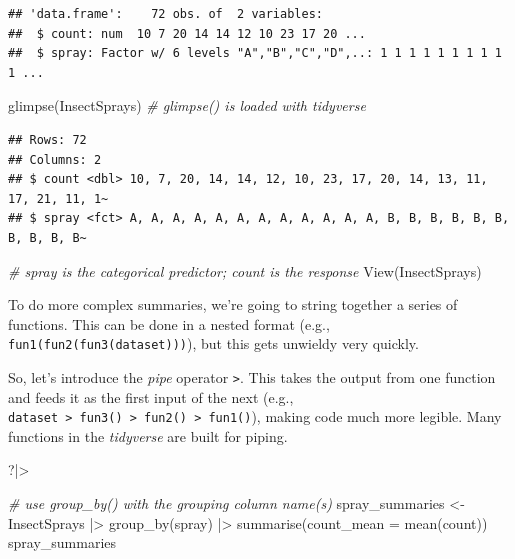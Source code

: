 \documentclass[
  11pt,
  a4paper,
]{book}
\newenvironment{Shaded}{\begin{snugshade}}{\end{snugshade}}
\newcommand{\AttributeTok}[1]{\textcolor[rgb]{0.77,0.63,0.00}{#1}}
\newcommand{\CommentTok}[1]{\textcolor[rgb]{0.56,0.35,0.01}{\textit{#1}}}
\newcommand{\FunctionTok}[1]{\textcolor[rgb]{0.00,0.00,0.00}{#1}}
\newcommand{\NormalTok}[1]{#1}
\newcommand{\OtherTok}[1]{\textcolor[rgb]{0.56,0.35,0.01}{#1}}
\newcommand{\SpecialCharTok}[1]{\textcolor[rgb]{0.00,0.00,0.00}{#1}}
\newcommand{\StringTok}[1]{\textcolor[rgb]{0.31,0.60,0.02}{#1}}
\begin{document}
\begin{verbatim}
## 'data.frame':    72 obs. of  2 variables:
##  $ count: num  10 7 20 14 14 12 10 23 17 20 ...
##  $ spray: Factor w/ 6 levels "A","B","C","D",..: 1 1 1 1 1 1 1 1 1 1 ...
\end{verbatim}

\begin{Shaded}
\begin{Highlighting}[]
\FunctionTok{glimpse}\NormalTok{(InsectSprays) }\CommentTok{\# glimpse() is loaded with tidyverse}
\end{Highlighting}
\end{Shaded}

\begin{verbatim}
## Rows: 72
## Columns: 2
## $ count <dbl> 10, 7, 20, 14, 14, 12, 10, 23, 17, 20, 14, 13, 11, 17, 21, 11, 1~
## $ spray <fct> A, A, A, A, A, A, A, A, A, A, A, A, B, B, B, B, B, B, B, B, B, B~
\end{verbatim}

\begin{Shaded}
\begin{Highlighting}[]
\CommentTok{\# spray is the categorical predictor; count is the response}
\FunctionTok{View}\NormalTok{(InsectSprays)}
\end{Highlighting}
\end{Shaded}

To do more complex summaries, we're going to string together a series of functions. This can be done in a nested format (e.g., \texttt{fun1(fun2(fun3(dataset)))}), but this gets unwieldy very quickly.

So, let's introduce the \emph{pipe} operator \texttt{\textbar{}\textgreater{}}. This takes the output from one function and feeds it as the first input of the next (e.g., \texttt{dataset\ \textbar{}\textgreater{}\ fun3()\ \textbar{}\textgreater{}\ fun2()\ \textbar{}\textgreater{}\ fun1()}), making code much more legible. Many functions in the \emph{tidyverse} are built for piping.

\begin{Shaded}
\begin{Highlighting}[]
\NormalTok{?}\StringTok{\textasciigrave{}}\AttributeTok{|\textgreater{}}\StringTok{\textasciigrave{}}
\end{Highlighting}
\end{Shaded}

\begin{Shaded}
\begin{Highlighting}[]
\CommentTok{\# use group\_by() with the grouping column name(s)}
\NormalTok{spray\_summaries }\OtherTok{\textless{}{-}}\NormalTok{ InsectSprays }\SpecialCharTok{|\textgreater{}}
  \FunctionTok{group\_by}\NormalTok{(spray) }\SpecialCharTok{|\textgreater{}}
  \FunctionTok{summarise}\NormalTok{(}\AttributeTok{count\_mean =} \FunctionTok{mean}\NormalTok{(count))}
\NormalTok{spray\_summaries}
\end{Highlighting}
\end{Shaded}
\end{document}
